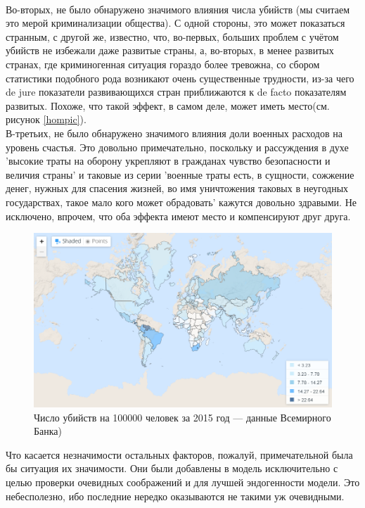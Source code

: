 \documentclass[russian]{vegareport}
\begin{document}
        \\
        Во-вторых, не было обнаружено значимого влияния числа убийств (мы считаем это мерой криминализации общества). С одной стороны, это может показаться странным, с другой же, известно, что, во-первых, больших проблем с учётом убийств не избежали даже развитые страны, а, во-вторых, в менее развитых странах, где криминогенная ситуация гораздо более тревожна, со сбором статистики подобного рода возникают очень существенные трудности, из-за чего de jure показатели развивающихся стран приближаются к de facto показателям развитых. Похоже, что такой эффект, в самом деле, может иметь место(см. рисунок \ref{hompic}).
        \\
        В-третьих, не было обнаружено значимого влияния доли военных расходов на уровень счастья. Это довольно примечательно, поскольку и рассуждения в духе 'высокие траты на оборону укрепляют в гражданах чувство безопасности и величия страны' и таковые из серии 'военные траты есть, в сущности, сожжение денег, нужных для спасения жизней, во имя уничтожения таковых в неугодных государствах, такое мало кого может обрадовать' кажутся довольно здравыми. Не исключено, впрочем, что оба эффекта имеют место и компенсируют друг друга.
        \\
        \begin{figure} \label{hompic}
            \centering
            \includegraphics[scale=0.45]{Report/homicides.png}
            \caption{Число убийств на 100000 человек за 2015 год --- данные Всемирного Банка)}
            \label{lect02:pic1}
        \end{figure}
        Что касается незначимости остальных факторов, пожалуй, примечательной была бы ситуация их значимости. Они были добавлены в модель исключительно с целью проверки очевидных соображений и для лучшей эндогенности модели. Это небесполезно, ибо последние нередко оказываются не такими уж очевидными.
\end{document}
